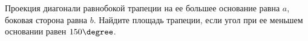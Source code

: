 \begin{ex}
	\begin{condition}
		Проекция диагонали равнобокой трапеции на ее большее основание равна \( a \), боковая сторона равна \( b \). Найдите площадь трапеции, если угол при ее меньшем основании равен \( 150\degree \).
	\end{condition}
\end{ex}